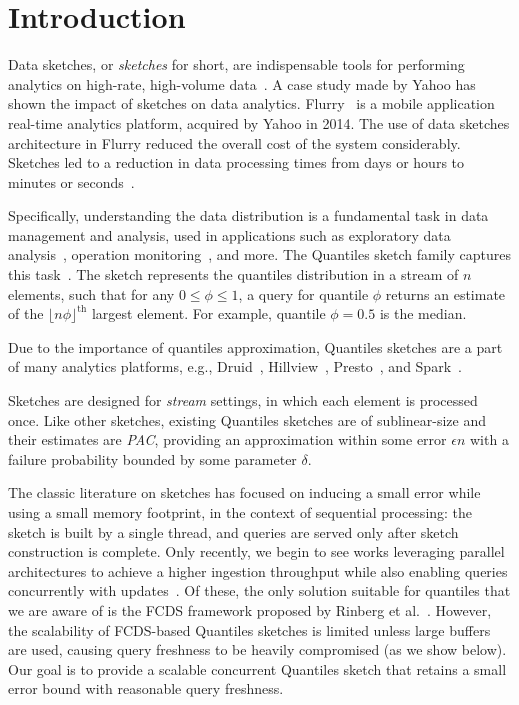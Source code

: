 \chapter{Introduction}
\label{chap:intro}

Data sketches, or \emph{sketches} for short, are indispensable tools for performing analytics on high-rate, high-volume data~\cite{KDD_tutorial}. A case study made by Yahoo has shown the impact of sketches on data analytics. Flurry~\cite{flurry} is a mobile application real-time analytics platform, acquired by Yahoo in 2014. The use of data sketches architecture in Flurry reduced the overall cost of the system considerably. Sketches led to a reduction in data processing times from days or hours to minutes or seconds~\cite{flurry_case}.

Specifically, understanding the data distribution is a fundamental task in data management and analysis, used in applications such as exploratory data analysis~\cite{vartak2015seedb}, operation monitoring~\cite{abraham2013scuba}, and more. The Quantiles sketch family captures this task~\cite{masson2019ddsketch, mergeables_summaries, gan2018moment, cormode2021relative}. The sketch represents the quantiles distribution in a stream of $n$ elements, such that for any $0 \leq \phi \leq 1$, a query for quantile $\phi$ returns an estimate of the $\lfloor n\phi \rfloor ^{\text{th}}$ largest element. For example, quantile $\phi=0.5$ is the median.

Due to the importance of quantiles approximation, Quantiles sketches are a part of many analytics platforms, e.g., Druid~\cite{druid-quantiles}, Hillview~\cite{budiu2019hillview}, Presto~\cite{presto}, and Spark~\cite{spark}.

Sketches are designed for \emph{stream} settings, in which each element is processed once. Like other sketches, existing Quantiles sketches are of sublinear-size and their estimates are \emph{\gls{PAC}}, providing an approximation within some error $\epsilon n$ with a failure probability bounded by some parameter $\delta$. 

The classic literature on sketches has focused on inducing a small error while using a small memory footprint, in the context of sequential processing: the sketch is built by a single thread, and queries are served only after sketch construction is complete. Only recently, we begin to see works leveraging parallel architectures to achieve a higher ingestion throughput while also enabling queries concurrently with updates~\cite{Rinberg_2020_fast_sketches, stylianopoulos2020delegation}. 
Of these, the only solution suitable for quantiles that we are aware of is the \acrfull{FCDS} framework proposed by Rinberg et al.~\cite{Rinberg_2020_fast_sketches}. However, the scalability of FCDS-based Quantiles sketches is limited unless large buffers are used, causing query freshness to be heavily compromised (as we show below). Our goal is to provide a scalable concurrent Quantiles sketch that retains a small error bound with reasonable query freshness.

